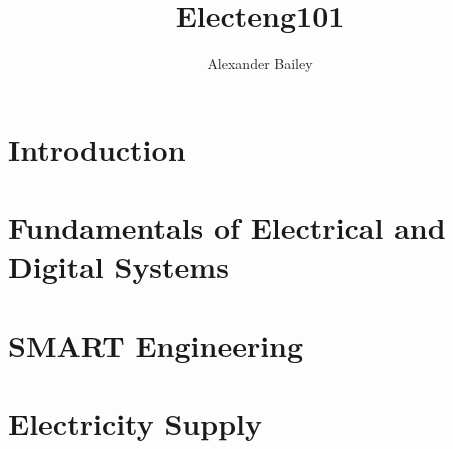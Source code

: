 \documentclass[12pt]{article}
\begin{document}
\title{Electeng101}
\author{Alexander Bailey}
\maketitle
\flushbottom

\section{Introduction}
\section{Fundamentals of Electrical and Digital Systems}
\section{SMART Engineering}
\section{Electricity Supply}
\end{document}
